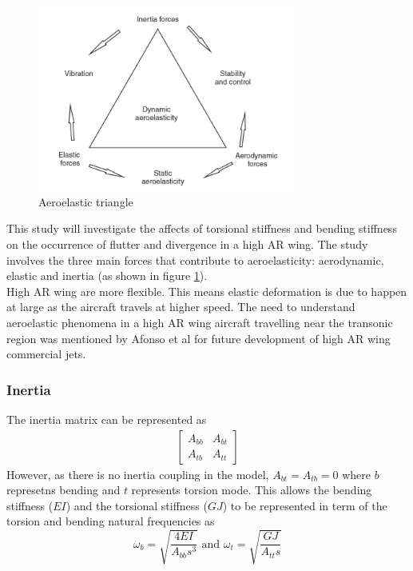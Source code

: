 \documentclass[11pt]{article}
\begin{document}
\begin{figure}
    \includegraphics[width=8.5cm]{figures/aeroelas_triangle.png}
    \caption{Aeroelastic triangle}
    \label{fig:aero-tri}
\end{figure} 

This study will investigate the affects of torsional stiffness and bending stiffness on the occurrence of flutter and divergence in a high AR wing. The study involves the three main forces that contribute to aeroelasticity: aerodynamic, elastic and inertia (as shown in figure \ref{fig:aero-tri}).\\

High AR wing are more flexible. This means elastic deformation is due to happen at large as the aircraft travels at higher speed. The need to understand aeroelastic phenomena in a high AR wing aircraft travelling near the transonic region was mentioned by Afonso et al \cite{Afonso2017AWings} for future development of high AR wing commercial jets.

\subsubsection{Inertia}
The inertia matrix can be represented as 
\begin{gather*}
    \begin{bmatrix}A_{bb} & A_{bt} \\ A_{tb} & A_{tt} \end{bmatrix}
\end{gather*}
However, as there is no inertia coupling in the model, $A_{bt} = A_{tb} = 0$ where $b$ represetns bending and $t$ represents torsion mode. This allows the bending stiffness ($EI$) and the torsional stiffness ($GJ$) to be represented in term of the torsion and bending natural frequencies as
\begin{equation}
    \omega_b = \sqrt{\frac{4EI}{A_{bb}s^3}} \text{ and } \omega_t = \sqrt{\frac{GJ}{A_{tt}s}}
\end{equation}
\end{document}
